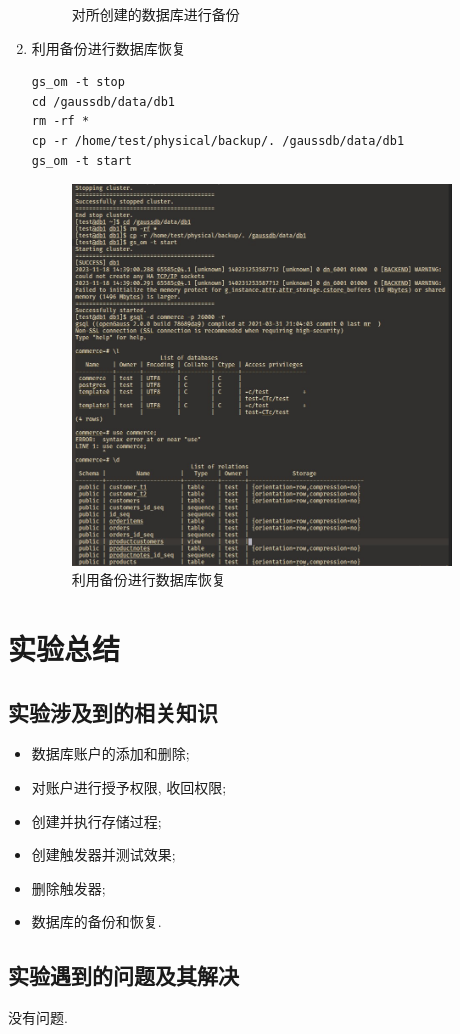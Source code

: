 \begin{enumerate}
\begin{figure}[H]
\begin{center}
  \end{center}
  \caption{对所创建的数据库进行备份}
\end{figure}
  \item 利用备份进行数据库恢复
\begin{verbatim}
gs_om -t stop
cd /gaussdb/data/db1
rm -rf *
cp -r /home/test/physical/backup/. /gaussdb/data/db1
gs_om -t start
\end{verbatim}
\begin{figure}[H]
  \begin{center}
    \includegraphics[width=0.95\textwidth]{./figures/restore.jpg}
  \end{center}
  \caption{利用备份进行数据库恢复}
\end{figure}
\end{enumerate}

\section{实验总结}

\subsection{实验涉及到的相关知识}
\begin{itemize}
  \item 数据库账户的添加和删除;
  \item 对账户进行授予权限, 收回权限;
  \item 创建并执行存储过程;
  \item 创建触发器并测试效果;
  \item 删除触发器;
  \item 数据库的备份和恢复.
\end{itemize}

\subsection{实验遇到的问题及其解决}
没有问题.
